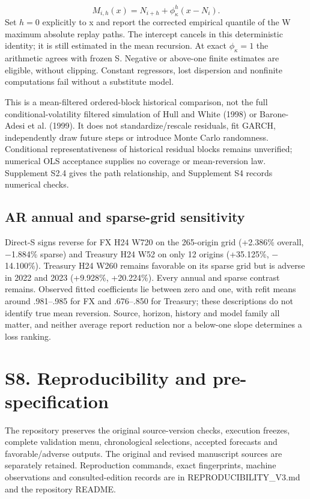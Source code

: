 \documentclass[11pt,a4paper]{article}
\begin{document}
\[
M_{i,h}(x)=N_{i+h}+\phi_\kappa^h(x-N_i).
\]
Set \(h=0\) explicitly to x and report the corrected empirical quantile of the W maximum absolute replay paths. The intercept cancels in this deterministic identity; it is still estimated in the mean recursion. At exact \(\phi_\kappa=1\) the arithmetic agrees with frozen S. Negative or above-one finite estimates are eligible, without clipping. Constant regressors, lost dispersion and nonfinite computations fail without a substitute model.

This is a mean-filtered ordered-block historical comparison, not the full conditional-volatility filtered simulation of Hull and White (1998) or Barone-Adesi et al. (1999). It does not standardize/rescale residuals, fit GARCH, independently draw future steps or introduce Monte Carlo randomness. Conditional representativeness of historical residual blocks remains unverified; numerical OLS acceptance supplies no coverage or mean-reversion law. Supplement S2.4 gives the path relationship, and Supplement S4 records numerical checks.

\subsection*{AR annual and sparse-grid sensitivity}
Direct-S signs reverse for FX H24 W720 on the 265-origin grid (+2.386\% overall, \(-\)1.884\% sparse) and Treasury H24 W52 on only 12 origins (+35.125\%, \(-\)14.100\%). Treasury H24 W260 remains favorable on its sparse grid but is adverse in 2022 and 2023 (+9.928\%, +20.224\%). Every annual and sparse contrast remains. Observed fitted coefficients lie between zero and one, with refit means around .981--.985 for FX and .676--.850 for Treasury; these descriptions do not identify true mean reversion. Source, horizon, history and model family all matter, and neither average report reduction nor a below-one slope determines a loss ranking.

\section*{S8. Reproducibility and pre-specification}
The repository preserves the original source-version checks, execution freezes, complete validation menu, chronological selections, accepted forecasts and favorable/adverse outputs. The original and revised manuscript sources are separately retained. Reproduction commands, exact fingerprints, machine observations and consulted-edition records are in REPRODUCIBILITY\_V3.md and the repository README.
\end{document}
